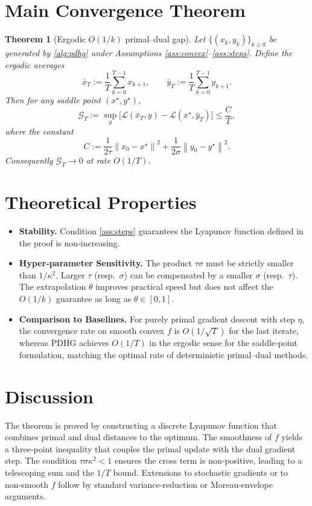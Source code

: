 \documentclass[11pt]{article}
\newtheorem{theorem}{Theorem}
\newcommand{\norm}[1]{\left\|#1\right\|}
\begin{document}
\section*{Main Convergence Theorem}
\begin{theorem}[Ergodic $O(1/k)$ primal–dual gap]\label{thm:rate}
Let $\{(x_k,y_k)\}_{k\ge0}$ be generated by \eqref{alg:pdhg} under Assumptions \ref{ass:convex}–\ref{ass:steps}.  
Define the ergodic averages
\[
\bar x_T:=\frac{1}{T}\sum_{k=0}^{T-1}x_{k+1},
\qquad
\bar y_T:=\frac{1}{T}\sum_{k=0}^{T-1}y_{k+1}.
\]
Then for any saddle point $(x^{\star},y^{\star})$,
\[
\mathcal{G}_T:=\sup_{y}\bigl[\mathcal{L}(\bar x_T,y)-\mathcal{L}(x^{\star},\bar y_T)\bigr]
\le \frac{C}{T},
\tag{4}
\]
where the constant
\[
C:=\frac{1}{2\tau}\norm{x_0-x^{\star}}^{2}
     +\frac{1}{2\sigma}\norm{y_0-y^{\star}}^{2}.
\]
Consequently $\mathcal{G}_T\to0$ at rate $O(1/T)$.
\end{theorem}

\section*{Theoretical Properties}
\begin{itemize}[nosep]
\item \textbf{Stability.} Condition \eqref{ass:steps} guarantees the Lyapunov function defined in the proof is non‑increasing.
\item \textbf{Hyper‑parameter Sensitivity.} The product $\tau\sigma$ must be strictly smaller than $1/\kappa^{2}$. Larger $\tau$ (resp.~$\sigma$) can be compensated by a smaller $\sigma$ (resp.~$\tau$). The extrapolation $\theta$ improves practical speed but does not affect the $O(1/k)$ guarantee as long as $\theta\in[0,1]$.
\item \textbf{Comparison to Baselines.} For purely primal gradient descent with step $\eta$, the convergence rate on smooth convex $f$ is $O(1/\sqrt{T})$ for the last iterate, whereas PDHG achieves $O(1/T)$ in the ergodic sense for the saddle‑point formulation, matching the optimal rate of deterministic primal–dual methods.
\end{itemize}

\section*{Discussion}
The theorem is proved by constructing a discrete Lyapunov function that combines primal and dual distances to the optimum. The smoothness of $f$ yields a three‑point inequality that couples the primal update with the dual gradient step. The condition $\tau\sigma\kappa^{2}<1$ ensures the cross term is non‑positive, leading to a telescoping sum and the $1/T$ bound. Extensions to stochastic gradients or to non‑smooth $f$ follow by standard variance‑reduction or Moreau‑envelope arguments.
\end{document}
